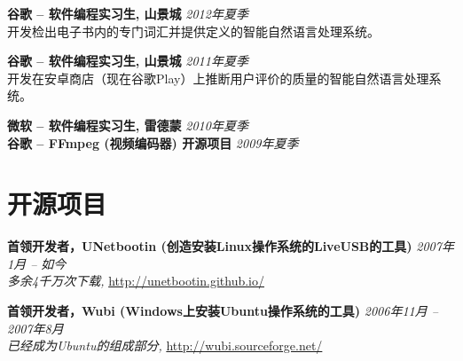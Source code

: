 \documentclass[margin,line]{resume}
\begin{document}
\begin{resume}
\textbf{谷歌 -- 软件编程实习生, 山景城} \hfill \textsl{2012年夏季}\\
开发检出电子书内的专门词汇并提供定义的智能自然语言处理系统。

\textbf{谷歌 -- 软件编程实习生, 山景城} \hfill \textsl{2011年夏季}\\
开发在安卓商店（现在谷歌Play）上推断用户评价的质量的智能自然语言处理系统。

\textbf{微软 -- 软件编程实习生, 雷德蒙} \hfill \textsl{2010年夏季}\\
\textbf{谷歌 -- FFmpeg (视频编码器) 开源项目} \hfill \textsl{2009年夏季}\\



\vspace{-3mm}

\section{\mysidestyle 开源项目}

\textbf{首领开发者，UNetbootin (创造安装Linux操作系统的LiveUSB的工具)} \hfill \textsl{2007年1月 -- 如今}\\
\emph{多余4千万次下载,} \url{http://unetbootin.github.io/}

\textbf{首领开发者，Wubi (Windows上安装Ubuntu操作系统的工具)} \hfill \textsl{2006年11月 -- 2007年8月}\\
\emph{已经成为Ubuntu的组成部分,} \url{http://wubi.sourceforge.net/}


\end{resume}
\end{document}

